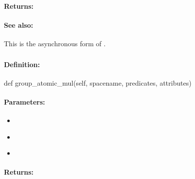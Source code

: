 \paragraph{Returns:}


\paragraph{See also:}  This is the asynchronous form of .

\pagebreak
\subsubsection{}
\label{api:python:group_atomic_mul}


\paragraph{Definition:}
\begin{pythoncode}
def group_atomic_mul(self, spacename, predicates, attributes)
\end{pythoncode}

\paragraph{Parameters:}
\begin{itemize}[noitemsep]
\item {}\\

\item {}\\

\item {}\\

\end{itemize}

\paragraph{Returns:}


\pagebreak
\subsubsection{}
\label{api:python:async_group_atomic_mul}



